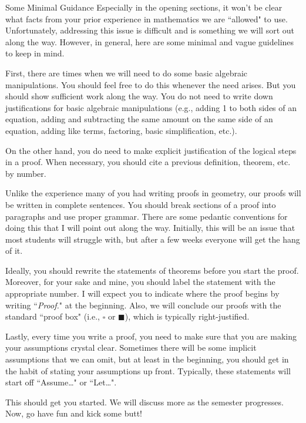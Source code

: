 \begin{section*}{Some Minimal Guidance}
Especially in the opening sections, it won't be clear what facts from your prior experience in mathematics we are ``allowed" to use.  Unfortunately, addressing this issue is difficult and is something we will sort out along the way.  However, in general, here are some minimal and vague guidelines to keep in mind.  

First, there are times when we will need to do some basic algebraic manipulations.  You should feel free to do this whenever the need arises.  But you should show sufficient work along the way.  You do not need to write down justifications for basic algebraic manipulations (e.g., adding 1 to both sides of an equation, adding and subtracting the same amount on the same side of an equation, adding like terms, factoring, basic simplification, etc.).  

On the other hand, you do need to make explicit justification of the logical steps in a proof.  When necessary, you should cite a previous definition, theorem, etc. by number.

Unlike the experience many of you had writing proofs in geometry, our proofs will be written in complete sentences.  You should break sections of a proof into paragraphs and use proper grammar.  There are some pedantic conventions for doing this that I will point out along the way.  Initially, this will be an issue that most students will struggle with, but after a few weeks everyone will get the hang of it.

Ideally, you should rewrite the statements of theorems before you start the proof.  Moreover, for your sake and mine, you should label the statement with the appropriate number.  I will expect you to indicate where the proof begins by writing ``\emph{Proof.}" at the beginning.  Also, we will conclude our proofs with the standard ``proof box" (i.e., $\square$ or $\blacksquare$), which is typically right-justified.

Lastly, every time you write a proof, you need to make sure that you are making your assumptions crystal clear.  Sometimes there will be some implicit assumptions that we can omit, but at least in the beginning, you should get in the habit of stating your assumptions up front.  Typically, these statements will start off ``Assume\ldots" or ``Let\ldots".  

This should get you started.  We will discuss more as the semester progresses.  Now, go have fun and kick some butt!

\end{section*}
